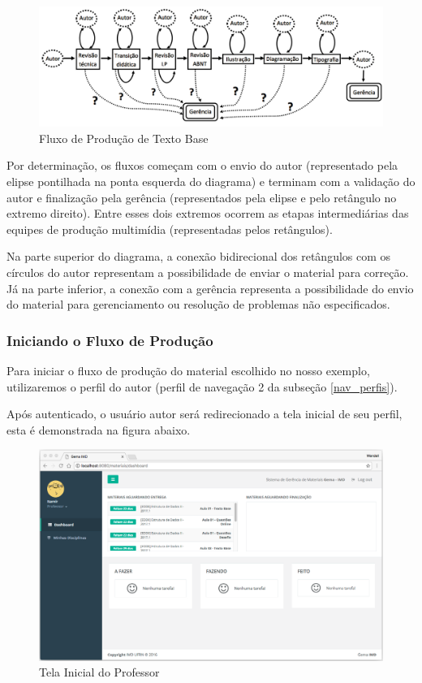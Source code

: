 \begin{figure}[H]
\centering
     \includegraphics[width=1.0\textwidth]{Screens/Flow.png}
      \caption{Fluxo de Produção de Texto Base}
       \label{fig:flow}
\end{figure}

Por determinação, os fluxos começam com o envio do autor (representado pela elipse pontilhada na ponta esquerda do diagrama) e terminam com a validação do autor e finalização pela gerência (representados pela elipse e pelo retângulo no extremo direito). Entre esses dois extremos ocorrem as etapas intermediárias das equipes de produção multimídia (representadas pelos retângulos). 

Na parte superior do diagrama, a conexão bidirecional dos retângulos com os círculos do autor representam a possibilidade de enviar o material para correção. Já na parte inferior, a conexão com a gerência representa a possibilidade do envio do material para gerenciamento ou resolução de problemas não especificados.

\subsubsection{Iniciando o Fluxo de Produção}

Para iniciar o fluxo de produção do material escolhido no nosso exemplo, utilizaremos o perfil do autor (perfil de navegação 2 da subseção \hyperref[nav_perfis]{\ref{nav_perfis}}).

Após autenticado, o usuário autor será redirecionado a tela inicial de seu perfil, esta é demonstrada na figura abaixo.

\begin{figure}[H]
\centering
     \includegraphics[width=1.0\textwidth]{Screens/DashboardAuthor.png}
      \caption{Tela Inicial do Professor}
       \label{fig:DashboardAuthor}
\end{figure}

